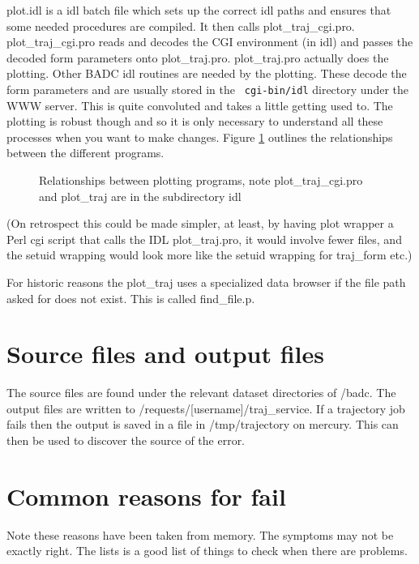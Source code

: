 \documentclass[a4paper]{article}
\begin{document}
plot.idl is a idl batch file which sets up the correct idl paths and
ensures that some needed procedures are compiled.
It then calls plot\_traj\_cgi.pro.  plot\_traj\_cgi.pro reads and
decodes the CGI environment (in idl) and passes the decoded form
parameters onto plot\_traj.pro.  plot\_traj.pro actually does the
plotting.  Other BADC idl routines are needed by the plotting.  These
decode the form parameters and are usually stored in the {\tt
cgi-bin/idl} directory under the WWW server.  This is quite convoluted
and takes a little getting used to.  The plotting is robust though and
so it is only necessary to understand all these processes when you
want to make changes.  Figure \ref{fig:plot_sequence} outlines the
relationships between the different programs.

\begin{figure}
\begin{center}
\epsfxsize=8pc 
\end{center}
\caption{Relationships between plotting programs, note plot\_traj\_cgi.pro and plot\_traj are in the subdirectory idl}
\label{fig:plot_sequence}
\end{figure}


(On retrospect this could be made simpler, at least, by having plot wrapper a
Perl cgi script that calls the IDL plot\_traj.pro, it would involve
fewer files, and the setuid wrapping would look more like the setuid
wrapping for traj\_form etc.)

For historic reasons the plot\_traj uses a specialized data browser if
the file path asked for does not exist.  This is called find\_file.p.

\section{Source files and output files}

The source files are found under the relevant dataset directories of
/badc.  The output files are written to
/requests/[username]/traj\_service.
If a trajectory job fails then the output is saved in a file in
/tmp/trajectory on mercury.  This can then be used to discover the
source of the error.

\section{Common reasons for fail}

Note these reasons have been taken from memory.  The symptoms may not
be exactly right.  The lists is a good list of things to check when
there are problems.
\end{document}
